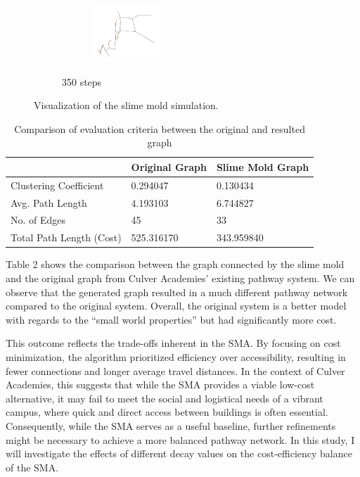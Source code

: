 \documentclass[11pt]{article}
\begin{document}
\begin{figure}[H]
\begin{subfigure}{0.24\textwidth}
	\begin{subfigure}{0.24\textwidth}
	    \centering
	    \hspace*{-1cm}
	    \includegraphics[width=100px]{350graph.png}
	\end{subfigure}
        \caption{350 steps}
    \end{subfigure}
    \caption{Visualization of the slime mold simulation.}
\end{figure}
\begin{table}[H]
\begin{center}
\begin{tabular}{|l|l|l|}
\hline
                         & Original Graph & Slime Mold Graph \\ \hline
Clustering Coefficient   & 0.294047       & 0.130434         \\ \hline
Avg. Path Length         & 4.193103       & 6.744827         \\ \hline
No. of Edges             & 45             & 33               \\ \hline
Total Path Length (Cost) & 525.316170     & 343.959840      \\ \hline
\end{tabular}
\caption{Comparison of evaluation criteria between the original and resulted graph}
\end{center}
\end{table}
\par
Table 2 shows the comparison between the graph connected by the slime mold and the original graph from Culver Academies’ existing pathway system. We can observe that the generated graph resulted in a much different pathway network compared to the original system. Overall, the original system is a better model with regards to the “small world properties” but had significantly more cost. \par
This outcome reflects the trade-offs inherent in the SMA. By focusing on cost minimization, the algorithm prioritized efficiency over accessibility, resulting in fewer connections and longer average travel distances. In the context of Culver Academies, this suggests that while the SMA provides a viable low-cost alternative, it may fail to meet the social and logistical needs of a vibrant campus, where quick and direct access between buildings is often essential. Consequently, while the SMA serves as a useful baseline, further refinements might be necessary to achieve a more balanced pathway network. In this study, I will investigate the effects of different decay values on the cost-efficiency balance of the SMA.  \par
\end{document}
